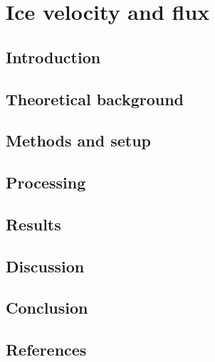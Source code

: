 

\renewcommand{\chapterauthor}{Julien, Linda Thielke, Moritz Bitterling}
\chapter{Ice velocity and flux}
\label{icevel}

\begin{abstract}

\end{abstract}


\section{Introduction}


\section{Theoretical background}


\section{Methods and setup}


\section{Processing}


\section{Results}


\section{Discussion}


\section{Conclusion}


\newpage
\section*{References}
%


